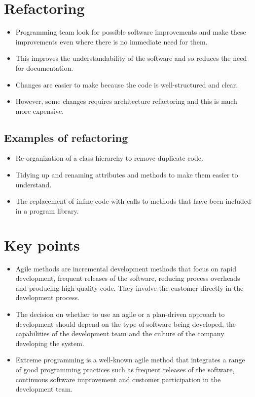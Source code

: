 \section{ Refactoring}
\begin{itemize}

\item Programming team look for possible software improvements and make these improvements even where there is no immediate need for them.

\item This improves the understandability of the software and so reduces the need for documentation.

\item Changes are easier to make because the code is well-structured and clear.

\item However, some changes requires architecture refactoring and this is much more expensive.

\end{itemize}
\subsection{ Examples of refactoring}
\begin{itemize}

\item Re-organization of a class hierarchy to remove duplicate code.

\item Tidying up and renaming attributes and methods to make them easier to understand.

\item The replacement of inline code with calls to methods that have been included in a program library.

\end{itemize}
\section{ Key points}
\begin{itemize}

\item Agile methods are incremental development methods that focus on rapid development, frequent releases of the software, reducing process overheads and producing high-quality code. They involve the customer directly in the development process.

\item The decision on whether to use an agile or a plan-driven approach to development should depend on the type of software being developed, the capabilities of the development team and the culture of the company developing the system.

\item Extreme programming is a well-known agile method that integrates a range of good programming practices such as frequent releases of the software, continuous software improvement and customer participation in the development team.


\end{itemize}
